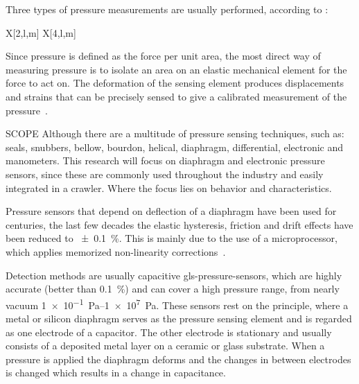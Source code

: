 \noindent Three types of pressure measurements are usually performed, according to \citet{webster_measurement_1999}:
\begin{RoyalTable}{X[2,l,m] X[4,l,m]}
\end{RoyalTable}

Since pressure is defined as the force per unit area, the most direct way of measuring pressure is to isolate an area on
an elastic mechanical element for the force to act on. The deformation of the sensing element produces displacements and
strains that can be precisely sensed to give a calibrated measurement of the pressure~\cite{webster_measurement_1999}.

\begin{RoyalNote}{SCOPE}
    Although there are a multitude of pressure sensing techniques, such as: seals, snubbers, bellow, bourdon, helical,
    diaphragm, differential, electronic and manometers. This research will focus on diaphragm and electronic pressure
    sensors, since these are commonly used throughout the industry and easily integrated in a crawler. Where the focus
    lies on behavior and characteristics.
\end{RoyalNote}

Pressure sensors that depend on deflection of a diaphragm have been used for centuries, the last few decades the elastic
hysteresis, friction and drift effects have been reduced to \SI{\pm 0.1}{\percent}. This is mainly due to the use of a
microprocessor, which applies memorized non-linearity corrections~\cite{liptak_instrument_2003}.

Detection methods are usually capacitive \gls{gls-pressure-sensor}s, which are highly accurate (better than
\SI{0.1}{\percent}) and can cover a high pressure range, from nearly vacuum \SIrange{1e-1}{1e7}{\pascal}. These sensors
rest on the principle, where a metal or silicon diaphragm serves as the pressure sensing element and is regarded as one
electrode of a capacitor. The other electrode is stationary and usually consists of a deposited metal layer on a ceramic
or glass substrate. When a pressure is applied the diaphragm deforms and the changes in between electrodes is changed
which results in a change in capacitance.

